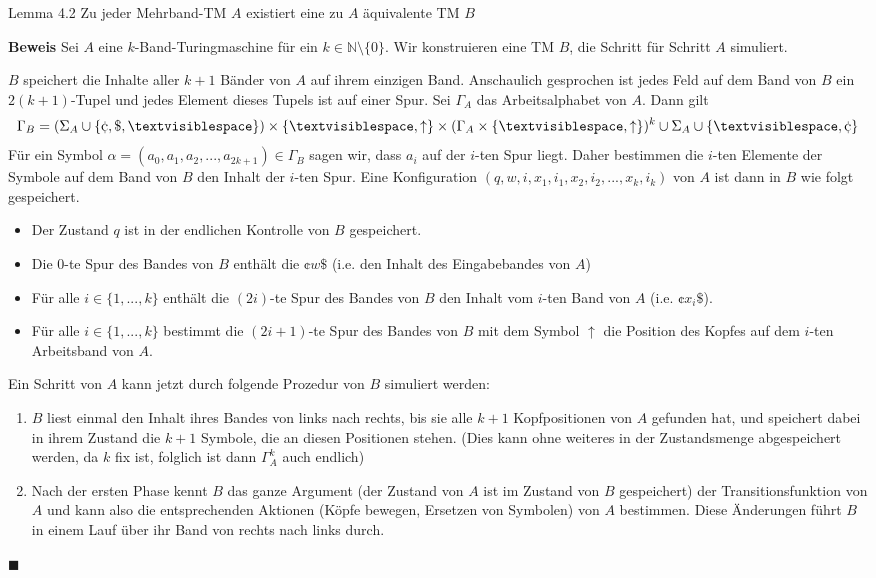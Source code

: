 \documentclass[a4paper, 11pt]{article}
\def\N{\mathbb{N}}
\begin{document}
        \begin{mainbox}{Lemma 4.2}
            Zu jeder Mehrband-TM $A$ existiert eine zu $A$ äquivalente TM $B$
        \end{mainbox}
        \textbf{Beweis}
        Sei $A$ eine $k$-Band-Turingmaschine für ein $k \in \N \setminus \{0\}$. Wir konstruieren eine TM $B$, die Schritt für Schritt $A$ simuliert.

        $B$ speichert die Inhalte aller $k+1$ Bänder von $A$ auf ihrem einzigen Band. Anschaulich gesprochen ist jedes Feld auf dem Band von $B$ ein $2(k+1)$-Tupel und jedes Element dieses Tupels ist auf einer Spur. 
        Sei $\Gamma_A$ das Arbeitsalphabet von $A$. Dann gilt 
        $$\Gamma_B = (\Sigma_A \cup \{\cent, \$, \textvisiblespace\}) \times \{\textvisiblespace,\uparrow\} \times (\Gamma_A \times \{\textvisiblespace, \uparrow\})^k \cup \Sigma_A \cup \{\textvisiblespace, \cent\}$$
        Für ein Symbol $\alpha = (a_0,a_1,a_2,...,a_{2k+1}) \in \Gamma_B$ sagen wir, dass $a_i$ auf der $i$-ten Spur liegt. Daher bestimmen die $i$-ten Elemente der Symbole auf dem Band von $B$ den Inhalt der $i$-ten Spur. Eine Konfiguration $(q,w,i,x_1,i_1,x_2,i_2,...,x_k,i_k)$ von $A$ ist dann in $B$ wie folgt gespeichert. 
        \begin{itemize}
            \item Der Zustand $q$ ist in der endlichen Kontrolle von $B$ gespeichert. 
            \item Die $0$-te Spur des Bandes von $B$ enthält die $\cent w\$$ (i.e. den Inhalt des Eingabebandes von $A$)
            \item Für alle $i \in \{1, ..., k\}$ enthält die $(2i)$-te Spur des Bandes von $B$ den Inhalt vom $i$-ten Band von $A$ (i.e. $\cent x_i\$$).
            \item Für alle $i \in \{1, ..., k\}$ bestimmt die $(2i +1)$-te Spur des Bandes von $B$ mit dem Symbol $\uparrow$ die Position des Kopfes auf dem $i$-ten Arbeitsband von $A$.
        \end{itemize}
        Ein Schritt von $A$ kann jetzt durch folgende Prozedur von $B$ simuliert werden:
        \begin{enumerate}
            \item $B$ liest einmal den Inhalt ihres Bandes von links nach rechts, bis sie alle $k+1$ Kopfpositionen von $A$ gefunden hat, und speichert dabei in ihrem Zustand die $k+1$ Symbole, die an diesen Positionen stehen. (Dies kann ohne weiteres in der Zustandsmenge abgespeichert werden, da $k$ fix ist, folglich ist dann $\Gamma_A^k$ auch endlich)
            \item Nach der ersten Phase kennt $B$ das ganze Argument (der Zustand von $A$ ist im Zustand von $B$ gespeichert) der Transitionsfunktion von $A$ und kann also die entsprechenden Aktionen (Köpfe bewegen, Ersetzen von Symbolen) von $A$ bestimmen. Diese Änderungen führt $B$ in einem Lauf über ihr Band von rechts nach links durch.
        \end{enumerate}
        \hspace*{0pt}\hfill$\blacksquare$
    
\end{document}
